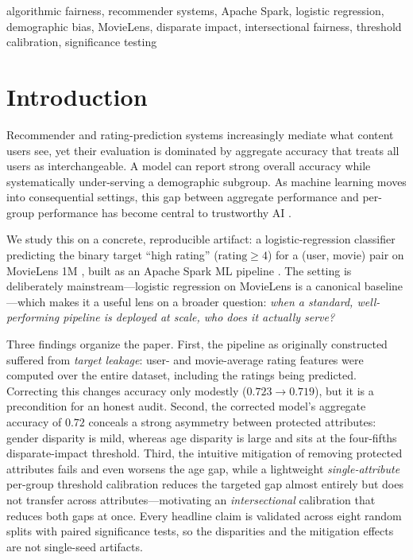\documentclass[conference]{IEEEtran}
\begin{document}
\begin{IEEEkeywords}
algorithmic fairness, recommender systems, Apache Spark, logistic regression,
demographic bias, MovieLens, disparate impact, intersectional fairness,
threshold calibration, significance testing
\end{IEEEkeywords}

\section{Introduction}
Recommender and rating-prediction systems increasingly mediate what content users
see, yet their evaluation is dominated by aggregate accuracy that treats all users
as interchangeable. A model can report strong overall accuracy while systematically
under-serving a demographic subgroup. As machine learning moves into consequential
settings, this gap between aggregate performance and per-group performance has
become central to trustworthy AI \cite{mehrabi2021survey,barocas2016big}.

We study this on a concrete, reproducible artifact: a logistic-regression classifier
predicting the binary target ``high rating'' ($\text{rating}\geq 4$) for a
(user, movie) pair on MovieLens 1M \cite{harper2015movielens}, built as an Apache
Spark ML pipeline \cite{meng2016mllib,zaharia2016spark}. The setting is deliberately
mainstream---logistic regression on MovieLens is a canonical baseline---which makes
it a useful lens on a broader question: \emph{when a standard, well-performing
pipeline is deployed at scale, who does it actually serve?}

Three findings organize the paper. First, the pipeline as originally constructed
suffered from \emph{target leakage}: user- and movie-average rating features were
computed over the entire dataset, including the ratings being predicted. Correcting
this changes accuracy only modestly ($0.723\rightarrow0.719$), but it is a
precondition for an honest audit. Second, the corrected model's aggregate accuracy
of $0.72$ conceals a strong asymmetry between protected attributes: gender disparity
is mild, whereas age disparity is large and sits at the four-fifths disparate-impact
threshold. Third, the intuitive mitigation of removing protected attributes fails
and even worsens the age gap, while a lightweight \emph{single-attribute} per-group threshold
calibration reduces the targeted gap almost entirely but does not transfer across
attributes---motivating an \emph{intersectional} calibration that reduces both gaps at
once. Every headline claim is validated across eight random splits with paired
significance tests, so the disparities and the mitigation effects are not single-seed
artifacts.
\end{document}
